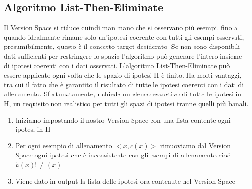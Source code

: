 \documentclass{article}
\begin{document}
\subsection{Algoritmo List-Then-Eliminate}
Il Version Space si riduce quindi man mano che si osservano più esempi, fino a quando idealmente rimane solo un'ipotesi coerente con tutti gli esempi osservati, presumibilmente, questo è il concetto target desiderato. Se non sono disponibili dati sufficienti per restringere lo spazio l'algoritmo può generare l'intero insieme di ipotesi coerenti con i dati osservati. L'algoritmo List-Then-Eliminate può essere applicato ogni volta che lo spazio di ipotesi H è finito. Ha molti vantaggi, tra cui il fatto che è garantito il risultato di tutte le ipotesi coerenti con i dati di allenamento. Sfortunatamente, richiede un elenco esaustivo di tutte le ipotesi in H, un requisito non realistico per tutti gli spazi di ipotesi tranne quelli più banali.
\begin{enumerate}
    \item Iniziamo impostando il nostro Version Space con una lista contente ogni ipotesi in H
    \item Per ogni esempio di allenamento $<x,c(x)>$ rimuoviamo dal Version Space ogni ipotesi che é inconsistente con gli esempi di allenamento cioé $h(x)!\neq(x)$
    \item Viene dato in output la lista delle ipotesi ora contenute nel Version Space
\end{enumerate}
\end{document}
